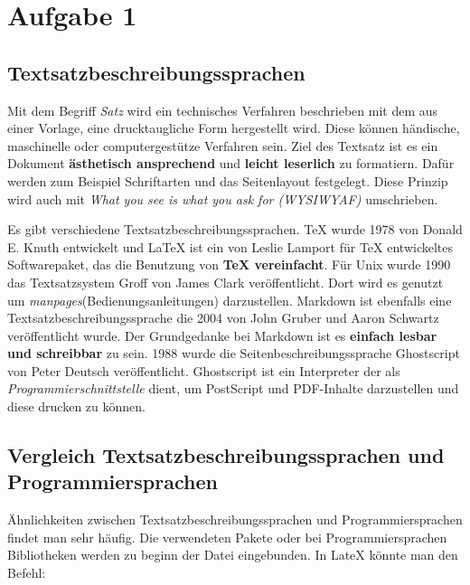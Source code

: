 \chapter{Aufgabe 1}
\section{Textsatzbeschreibungssprachen}
Mit dem Begriff \textit{Satz} wird ein technisches Verfahren beschrieben mit dem aus einer Vorlage, eine drucktaugliche Form hergestellt wird.
Diese können händische, maschinelle oder computergestütze Verfahren sein.
Ziel des Textsatz ist es ein Dokument \textbf{ästhetisch ansprechend} und \textbf{leicht leserlich} zu formatiern.
Dafür werden zum Beispiel Schriftarten und das Seitenlayout festgelegt\cite{satzwiki:2023}.
Diese Prinzip wird auch mit \textit{What you see is what you ask for (WYSIWYAF)} umschrieben.\par
Es gibt verschiedene Textsatzbeschreibungssprachen.
TeX wurde 1978 von Donald E. Knuth entwickelt und LaTeX\cite{latex:2023} ist ein von Leslie Lamport für TeX\cite{tex:2023} entwickeltes Softwarepaket, das die Benutzung von \textbf{TeX vereinfacht}.
Für Unix wurde 1990 das Textsatzsystem Groff von James Clark veröffentlicht.
Dort wird es genutzt um \textit{manpages}(Bedienungsanleitungen) darzustellen\cite{groff:2022}.
Markdown ist ebenfalls eine Textsatzbeschreibungssprache die 2004 von John Gruber und Aaron Schwartz veröffentlicht wurde.
Der Grundgedanke bei Markdown ist es \textbf{einfach lesbar und schreibbar} zu sein\cite{lasar:2013}.
1988 wurde die Seitenbeschreibungssprache Ghostscript von Peter Deutsch veröffentlicht.
Ghostscript ist ein Interpreter der als \textit{Programmierschnittstelle} dient, um PostScript und PDF-Inhalte darzustellen und diese drucken zu können\cite{ghostscript:2022}. 

\section{Vergleich Textsatzbeschreibungssprachen und Programmiersprachen}
Ähnlichkeiten zwischen Textsatzbeschreibungssprachen und Programmiersprachen findet man sehr häufig. 
Die verwendeten Pakete oder bei Programmiersprachen Bibliotheken werden zu beginn der Datei eingebunden.
In LateX könnte man den Befehl:
\begin{lstlisting}
 


\end{lstlisting}

